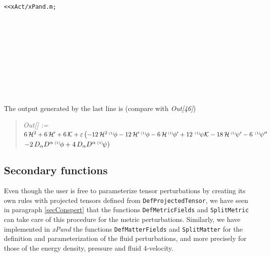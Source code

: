 \documentclass[notitlepage,onecolumn,floatfix,preprintnumbers,aps,prd,showpacs,nofootinbib,amsmath,amssymb,amsfonts]{revtex4-1}
\newcommand{\gr}[1]{{\bm #1}}
\newcommand{\<}{\langle}
\renewcommand{\>}{\rangle}
\newcounter{inout}
\newcommand{\pertbis}[2]{{}^{\mbox{\,\tiny $(#1)\!$}}{#2}}
\newcommand{\mathOutTwoLines}[2]{
	\begin{quotation} {\em Out[\theinout] :=\ } {\tt #1} \\ 
	\phantom{\em Out[\theinout] := \quad \;\,}  {\tt #2}\end{quotation}}
\newcommand{\ttgr}[1]{{#1}}
\newcommand{\bb}{{\ttgr{\alpha}}}
\newcommand{\cc}{{\ttgr{\beta}}}
\begin{document}
\vspace{3mm}

%
{\tt <<xAct/xPand.m;} \\
 \\
 \\
 \\
 \\
 \\
 \\
 \\
\\
\indent{\tt MyGauge = {dg[LI[ord\_], $\bb$\_, $\cc$\_] :> - 2 n[$\bb$]n[$\cc$] $\phi$[LI[ord]] - 2 h[$\bb$, $\cc$] $\psi$[LI[ord]]};}\\
%

\vspace{3mm}

\noindent
The output generated by the last line is (compare with \textit{Out[46]}) 
\mathOutTwoLines{$%
	6 \, {\cal H}^2 + 6 \, {\cal H}' + 6 \, \mathcal{K} + 
	\varepsilon \left(-12 \, {\cal H}^2 \pertbis{1}{\phi} - 12 \, {\cal H}' \pertbis{1}{\phi} - 
	6 \, {\cal H} \pertbis{1}{\phi'} + 12 \, \pertbis{1}{\psi} {\cal K} - 18 \, {\cal H} \pertbis{1}{\psi'} 
	- 6 \, \pertbis{1}{\psi''}\right.$}%
	{$\left. - 2 \, D_\bb D^\bb \pertbis{1}{\phi} + 4 \, D_\bb D^\bb \pertbis{1}{\psi} \right)$} 

\subsection{Secondary functions}

Even though the user is free to parameterize tensor perturbations by creating its own rules 
with projected tensors defined from {\tt DefProjectedTensor}, we have seen in paragraph 
\ref{secConspert} that the functions {\tt DefMetricFields} and {\tt SplitMetric} 
can take care of this procedure for the metric perturbations. Similarly, we have implemented 
in \textit{xPand} the functions {\tt DefMatterFields} and {\tt SplitMatter} for 
the definition and parameterization of the fluid perturbations, and more precisely for 
those of the energy density, pressure and fluid 4-velocity.  
%
\end{document}
